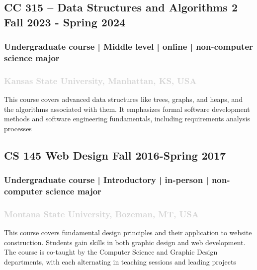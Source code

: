 \documentclass[11pt]{article}
\begin{document}
  \subsection{CC 315 – Data Structures and Algorithms 2  \hfill \normalfont Fall 2023 - Spring 2024 }
  \subsubsection{ Undergraduate course | Middle level | online | non-computer science major   }
  \subsubsection{ \normalfont \textcolor{lightgray}{ Kansas State University, Manhattan, KS, USA   }}
    \vspace{0.4em} %
     \noindent
This course covers advanced data structures like trees, graphs, and heaps, and the algorithms associated with them. It emphasizes formal software development methods and software engineering fundamentals, including requirements analysis processes

\label{sec: CS145} 
   \vspace{0.8em} %
   
\subsection{ CS 145 Web Design \hfill \normalfont Fall 2016-Spring 2017}
\subsubsection{ Undergraduate course | Introductory | in-person | non-computer science major   }
  \subsubsection{ \normalfont \textcolor{lightgray}{Montana State University, Bozeman, MT, USA   }}
 \vspace{0.4em} %
    \noindent
 This course covers fundamental design principles and their application to website construction. Students gain skills in both graphic design and web development. The course is co-taught by the Computer Science and Graphic Design departments, with each alternating in teaching sessions and leading projects

   \label{sec: CIS501} 
   \vspace{0.8em} %
   
\end{document}
